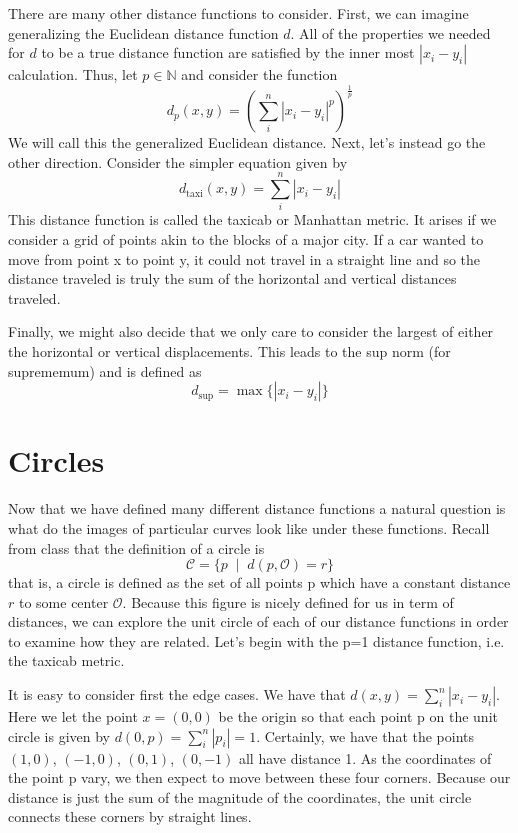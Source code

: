 \documentclass[a4paper, 12pt]{article}
\begin{document}
There are many other distance functions to consider. First, we can imagine generalizing the Euclidean distance function $d$. All of the properties we needed for $d$ to be a true distance function are satisfied by the inner most $|x_i-y_i|$ calculation. Thus, let $p\in\mathbb{N}$ and consider the function
\begin{equation*}
  d_p(x,y) = \left(\sum_i^n|x_i-y_i|^p\right)^{\frac{1}{p}}
\end{equation*}
We will call this the generalized Euclidean distance. Next, let's instead go the other direction. Consider the simpler equation given by
\begin{equation*}
  d_\text{taxi}(x,y) = \sum_i^n |x_i-y_i|
\end{equation*}
This distance function is called the taxicab or Manhattan metric. It arises if we consider a grid of points akin to the blocks of a major city. If a car wanted to move from point x to point y, it could not travel in a straight line and so the distance traveled is truly the sum of the horizontal and vertical distances traveled.

Finally, we might also decide that we only care to consider the largest of either the horizontal or vertical displacements. This leads to the sup norm (for suprememum) and is defined as
\begin{equation*}
  d_\text{sup} = \max\{|x_i-y_i|\}
\end{equation*}

\section*{Circles}
Now that we have defined many different distance functions a natural question is what do the images of particular curves look like under these functions. Recall from class that the definition of a circle is
\begin{equation*}
  \mathcal{C} = \{p \;\; | \;\;d(p,\mathcal{O})=r\}
\end{equation*}
that is, a circle is defined as the set of all points p which have a constant distance $r$ to some center $\mathcal{O}$. Because this figure is nicely defined for us in term of distances, we can explore the unit circle of each of our distance functions in order to examine how they are related. Let's begin with the p=1 distance function, i.e. the taxicab metric.

It is easy to consider first the edge cases. We have that $d(x,y) = \sum_i^n|x_i-y_i|$. Here we let the point $x=(0,0)$ be the origin so that each point p on the unit circle is given by $d(0,p)=\sum_i^n|p_i|=1$. Certainly, we have that the points $(1,0)$, $(-1,0)$, $(0,1)$, $(0,-1)$ all have distance 1. As the coordinates of the point p vary, we then expect to move between these four corners. Because our distance is just the sum of the magnitude of the coordinates, the unit circle connects these corners by straight lines.
\end{document}
